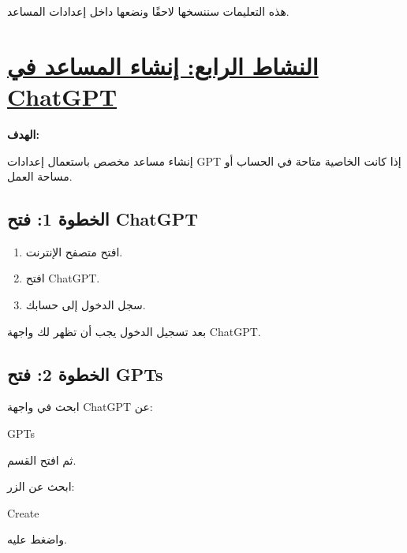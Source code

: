\documentclass[a4paper]{article}
\begin{document}
هذه التعليمات سننسخها لاحقًا ونضعها داخل إعدادات
المساعد.



\section*{\khatt\underline{النشاط الرابع: إنشاء المساعد في ChatGPT}}

\textbf{الهدف:}

إنشاء مساعد مخصص باستعمال إعدادات
\textenglish{GPT} إذا كانت الخاصية متاحة في
الحساب أو مساحة العمل.

\subsection*{\khatt الخطوة 1: فتح ChatGPT}

\begin{enumerate}

    \item افتح متصفح الإنترنت.

    \item افتح \textenglish{ChatGPT}.

    \item سجل الدخول إلى حسابك.

\end{enumerate}

بعد تسجيل الدخول يجب أن تظهر لك واجهة ChatGPT.



\subsection*{\khatt الخطوة 2: فتح GPTs}

ابحث في واجهة ChatGPT عن:

\begin{center}

\textenglish{GPTs}

\end{center}

ثم افتح القسم.

ابحث عن الزر:

\begin{center}

\textenglish{Create}
\end{center}

واضغط عليه.
\end{document}
